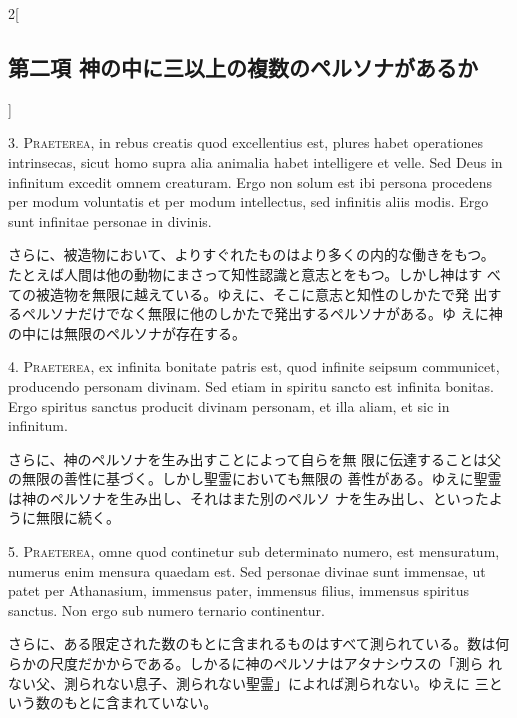 \documentclass[paper=a4paper,fontsize=10pt,jafontsize=9pt,titlepage]{jlreq}
\begin{document}
\begin{paracol}{2}[\subsection{第二項 神の中に三以上の複数のペルソナがあるか}]


3. {\scshape Praeterea}, in rebus creatis quod excellentius est, plures habet
operationes intrinsecas, sicut homo supra alia animalia habet
intelligere et velle. Sed Deus in infinitum excedit omnem
creaturam. Ergo non solum est ibi persona procedens per modum
voluntatis et per modum intellectus, sed infinitis aliis modis. Ergo
sunt infinitae personae in divinis.


\switchcolumn


さらに、被造物において、よりすぐれたものはより多くの内的な働きをもつ。
 たとえば人間は他の動物にまさって知性認識と意志とをもつ。しかし神はす
 べての被造物を無限に越えている。ゆえに、そこに意志と知性のしかたで発
 出するペルソナだけでなく無限に他のしかたで発出するペルソナがある。ゆ
 えに神の中には無限のペルソナが存在する。




4. {\scshape Praeterea}, ex infinita bonitate patris est, quod infinite seipsum
communicet, producendo personam divinam. Sed etiam in spiritu sancto
est infinita bonitas. Ergo spiritus sanctus producit divinam personam,
et illa aliam, et sic in infinitum.


\switchcolumn


さらに、神のペルソナを生み出すことによって自らを無
 限に伝達することは父の無限の善性に基づく。しかし聖霊においても無限の
 善性がある。ゆえに聖霊は神のペルソナを生み出し、それはまた別のペルソ
 ナを生み出し、といったように無限に続く。




5. {\scshape Praeterea,} omne quod continetur sub determinato numero, est
mensuratum, numerus enim mensura quaedam est. Sed personae divinae
sunt immensae, ut patet per Athanasium, immensus pater, immensus
filius, immensus spiritus sanctus. Non ergo sub numero ternario
continentur.


\switchcolumn


さらに、ある限定された数のもとに含まれるものはすべて測られている。数は何
 らかの尺度だかからである。しかるに神のペルソナはアタナシウスの「測ら
 れない父、測られない息子、測られない聖霊」によれば測られない。ゆえに
 三という数のもとに含まれていない。



\end{paracol}
\end{document}
